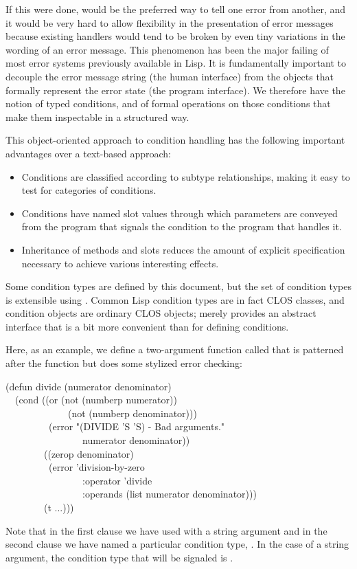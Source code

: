 If this were done,  would be the preferred way to tell one error
from another, and it would be very hard to allow flexibility in the
presentation of error messages because existing handlers would tend to be
broken by even tiny variations in the wording of an error message. This
phenomenon has been the major failing of most error systems previously
available in Lisp. It is fundamentally important to decouple the error
message string (the human interface) from the objects that formally
represent the error state (the program interface). We therefore have the
notion of typed conditions, and of formal operations on those conditions
that make them inspectable in a structured way.

This object-oriented approach to condition handling has the following
important advantages over a text-based approach:
\begin{itemize}
\item
   Conditions are classified according to subtype relationships, making
   it easy to test for categories of conditions.

\item
   Conditions have named slot values through which parameters are conveyed
   from the program that signals the condition to the program that handles it.

\item
   Inheritance of methods and slots reduces the amount of explicit
   specification necessary to achieve various interesting effects.
\end{itemize}

Some condition types are defined by this document, but the set of 
condition types is extensible using .
Common Lisp condition types are in fact CLOS classes, and condition objects
are ordinary CLOS objects;  merely
provides an abstract interface that is a bit more convenient than
 for defining conditions.

Here, as an example,
we define a two-argument function called  that is patterned after
the \cd{/} function but does some stylized error checking:
\begin{lisp}
(defun divide (numerator denominator) \\
~~(cond ((or (not (numberp numerator)) \\
~~~~~~~~~~~~~(not (numberp denominator))) \\
~~~~~~~~~(error "(DIVIDE '{\Xtilde}S '{\Xtilde}S) - Bad arguments." \\
~~~~~~~~~~~~~~~~numerator denominator)) \\
~~~~~~~~((zerop denominator) \\
~~~~~~~~~(error 'division-by-zero \\
~~~~~~~~~~~~~~~~:operator 'divide \\
~~~~~~~~~~~~~~~~:operands (list numerator denominator))) \\
~~~~~~~~(t ...)))
\end{lisp}
Note that in the first clause we have used  with a string argument
and in the second clause we have named a particular condition type,
. In the case of a string argument, the condition type that
will be signaled is .

